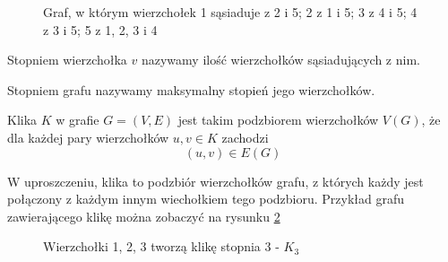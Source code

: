   \begin{figure}[H]
    \centering
    \caption{Graf, w którym wierzchołek 1 sąsiaduje z 2 i 5; 2 z 1 i 5; 3 z 4 i 5; 4 z 3 i 5; 5 z 1, 2, 3 i 4 }
    \label{sasie}
  \end{figure}
  
     \begin{definition}
	Stopniem wierzchołka $v$ nazywamy ilość wierzchołków sąsiadujących z nim.
   \end{definition}
   
    \begin{definition}
 Stopniem grafu nazywamy maksymalny stopień jego wierzchołków. 
   \end{definition}

   \begin{definition}[Klika]
    Klika $K$ w grafie $G=(V,E)$ jest takim podzbiorem wierzchołków $V(G)$, że dla każdej pary wierzchołków $u, v \in K$ zachodzi $$(u, v) \in E(G)$$ 
   \end{definition}
   
   W uproszczeniu, klika to podzbiór wierzchołków grafu, z których każdy jest połączony z każdym innym wiechołkiem tego podzbioru. Przykład grafu zawierającego klikę można zobaczyć na rysunku \ref{klik}
   \begin{figure}[H]
   \centering
     \caption{Wierzchołki 1, 2, 3 tworzą klikę stopnia 3 - $K_3$ }
     \label{klik}
  \end{figure}

